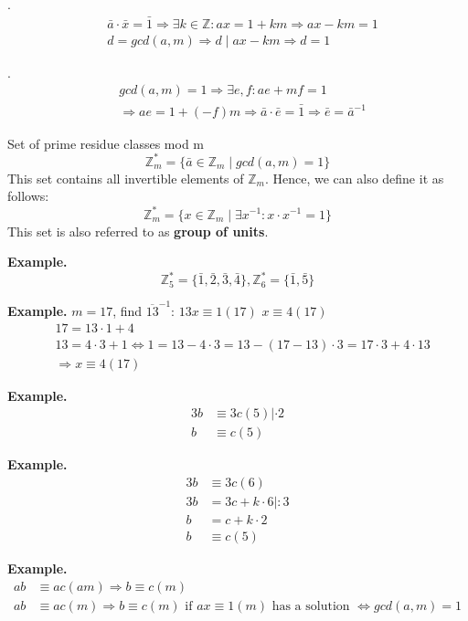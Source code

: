 \ProofForward.
\begin{align*}
  & \bar{a}\cdot \bar{x} = \bar{1} \Rightarrow \exists k\in \mathbb{Z}:
    ax = 1 + km \Rightarrow ax - km = 1\\
  & d = gcd(a,m) \Rightarrow d \mid ax - km \Rightarrow d = 1
\end{align*}

\ProofBackward.
\begin{align*}
  & gcd(a,m) = 1 \Rightarrow \exists e,f : ae + mf = 1\\
  & \Rightarrow ae = 1 + (-f)m \Rightarrow \bar{a} \cdot \bar{e} = \bar{1}
    \Rightarrow \bar{e} = \bar{a}^{-1}
\end{align*}


\begin{definition}
Set of prime residue classes mod m
\[
  \mathbb{Z}_m^{*} = \{ \bar{a} \in \mathbb{Z}_m \mid gcd(a,m) = 1 \}
\]
This set contains all invertible elements of $\mathbb{Z}_m$. Hence, we can also define it as follows:
\[
  \mathbb{Z}_m^{*} = \{ x \in \mathbb{Z}_m \mid \exists x^{-1} : x \cdot x^{-1} = 1 \}
\]
This set is also referred to as \textbf{group of units}.
\end{definition}

\textbf{Example.}
\[
  \mathbb{Z}_5^{*} = \{ \bar{1}, \bar{2}, \bar{3}, \bar{4} \}, \mathbb{Z}_6^{*} = \{ \bar{1}, \bar{5} \}
\]

\textbf{Example.}
$ m = 17$, find $\overline{13}^{-1}$: $ 13 x \equiv 1 (17)$ $x \equiv 4 (17)$
\begin{align*}
  & 17 = 13 \cdot  1 +4\\
  & 13 = 4\cdot 3 +1 \iff 1 = 13-4\cdot 3 = 13-(17-13)\cdot 3 = 17\cdot
    3+4\cdot 13 \\
  & \Rightarrow x \equiv 4 (17)
\end{align*}

\textbf{Example.}
\begin{align*}
  3b &\equiv 3c (5) | \cdot 2 \\
  b &\equiv c(5)
\end{align*}

\textbf{Example.}
\begin{align*}
  3b &\equiv 3c (6) \\
  3b &= 3c + k \cdot 6 | :3 \\
  b &= c + k \cdot 2 \\
  b &\equiv c(5)
\end{align*}

\textbf{Example.}
\begin{align*}
  ab &\equiv ac (am) \Rightarrow b \equiv  c (m) \\
  ab &\equiv ac (m) \Rightarrow b \equiv c (m)
    \text{ if } ax \equiv 1 (m) \text{ has a solution } \iff gcd(a,m) = 1
\end{align*}

